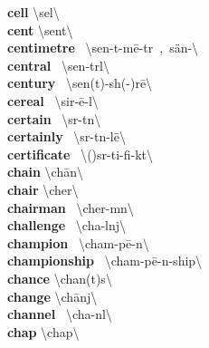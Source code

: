 \documentclass[10pt,a4paper]{article}
\begin{document}
\begin{multicols}{2}
\textbf{ cell }\quad \textbackslash \textprimstress sel\textbackslash \\
\textbf{ cent }\quad \textbackslash \textprimstress sent\textbackslash \\
\textbf{ centimetre }\quad \ \textbackslash \textprimstress sen-t\textschwa -\textsecstress m\={e}-t\textschwa r\ ,\ \textprimstress s\"{a}n-\textbackslash \\
\textbf{ central }\quad \ \textbackslash \textprimstress sen-tr\textschwa l\textbackslash \\
\textbf{ century }\quad \ \textbackslash \textprimstress sen(t)-sh(\textschwa -)r\={e}\textbackslash \\
\textbf{ cereal }\quad \ \textbackslash \textprimstress sir-\={e}-\textschwa l\textbackslash \\
\textbf{ certain }\quad \ \textbackslash \textprimstress s\textschwa r-t\textsuperscript{\textreve}n\textbackslash \\
\textbf{ certainly }\quad \ \textbackslash \textprimstress s\textschwa r-t\textsuperscript{\textreve}n-l\={e}\textbackslash \\
\textbf{ certificate }\quad \ \textbackslash (\textsecstress )s\textschwa r-\textprimstress ti-fi-k\textschwa t\textbackslash \\
\textbf{ chain }\quad \textbackslash \textprimstress ch\={a}n\textbackslash \\
\textbf{ chair }\quad \textbackslash \textprimstress cher\textbackslash \\
\textbf{ chairman }\quad \ \textbackslash \textprimstress cher-m\textschwa n\textbackslash \\
\textbf{ challenge }\quad \ \textbackslash \textprimstress cha-l\textschwa nj\textbackslash \\
\textbf{ champion }\quad \ \textbackslash \textprimstress cham-p\={e}-\textschwa n\textbackslash \\
\textbf{ championship }\quad \ \textbackslash \textprimstress cham-p\={e}-\textschwa n-\textsecstress ship\textbackslash \\
\textbf{ chance }\quad \textbackslash \textprimstress chan(t)s\textbackslash \\
\textbf{ change }\quad \textbackslash \textprimstress ch\={a}nj\textbackslash \\
\textbf{ channel }\quad \ \textbackslash \textprimstress cha-n\textsuperscript{\textreve}l\textbackslash \\
\textbf{ chap }\quad \textbackslash \textprimstress chap\textbackslash \\

\end{multicols}
\end{document}
